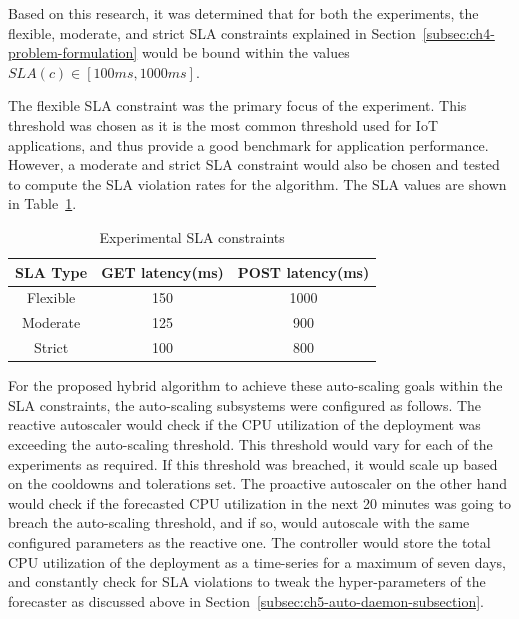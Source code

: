 Based on this research, it was determined that for both the experiments, the flexible, moderate, and strict SLA constraints explained in Section~\ref{subsec:ch4-problem-formulation} would be bound within the values $SLA(c) \in [100ms, 1000ms]$.\par

The flexible SLA constraint was the primary focus of the experiment. This threshold was chosen as it is the most common threshold used for IoT applications, and thus provide a good benchmark for application performance. However, a moderate and strict SLA constraint would also be chosen and tested to compute the SLA violation rates for the algorithm. The SLA values are shown in Table~\ref{tab:experiment-sla-values}.\par

\begin{table}
    \caption{Experimental SLA constraints}\label{tab:experiment-sla-values}
    \centering
    \begin{tabular}{ccc}
        \toprule
        \textbf{SLA Type} & \textbf{GET latency(ms)} & \textbf{POST latency(ms)}\\
        \midrule
        Flexible    & 150   & 1000\\
        Moderate    & 125   & 900\\
        Strict      & 100   & 800\\
        \toprule
    \end{tabular}
\end{table}

For the proposed hybrid algorithm to achieve these auto-scaling goals within the SLA constraints, the auto-scaling subsystems were configured as follows. The reactive autoscaler would check if the CPU utilization of the deployment was exceeding the auto-scaling threshold. This threshold would vary for each of the experiments as required. If this threshold was breached, it would scale up based on the cooldowns and tolerations set. The proactive autoscaler on the other hand would check if the forecasted CPU utilization in the next 20 minutes was going to breach the auto-scaling threshold, and if so, would autoscale with the same configured parameters as the reactive one. The controller would store the total CPU utilization of the deployment as a time-series for a maximum of seven days, and constantly check for SLA violations to tweak the hyper-parameters of the forecaster as discussed above in Section~\ref{subsec:ch5-auto-daemon-subsection}.\par

